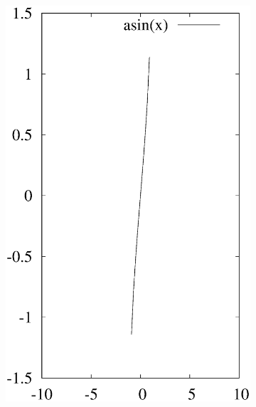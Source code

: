 \documentclass[letterpaper,showpacs,prb,preprint]{revtex4}
\begin{document}
\begin{figure}[ht]
\begin{subfigure}{0.3\textwidth}
\includegraphics [width=\textwidth]{asin.eps}

\end{subfigure}
\end{figure}
\end{document}
